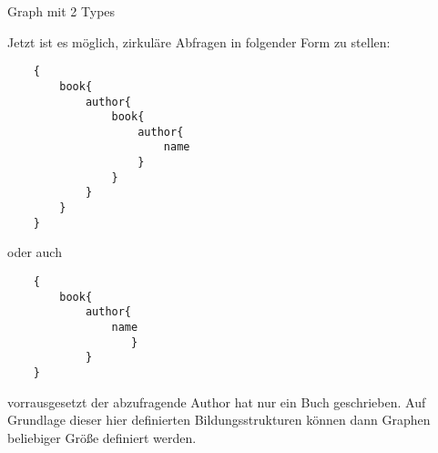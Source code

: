 \begin{figure2}
    \begin{center}
        \caption{Graph mit 2 Types}
    \end{center}
    \label{fig:2typescirc}
\end{figure2}

Jetzt ist es möglich, zirkuläre Abfragen in folgender Form zu stellen:

\begin{verbatim}
    {
        book{
            author{
                book{
                    author{
                        name
                    }
                }
            }
        }
    }
\end{verbatim}

oder auch

\begin{verbatim}
    {
        book{
            author{
                name
                   }
            }
    }
\end{verbatim}

vorrausgesetzt der abzufragende Author hat nur ein Buch geschrieben.
Auf Grundlage dieser hier definierten Bildungsstrukturen können dann Graphen beliebiger Größe definiert werden.



